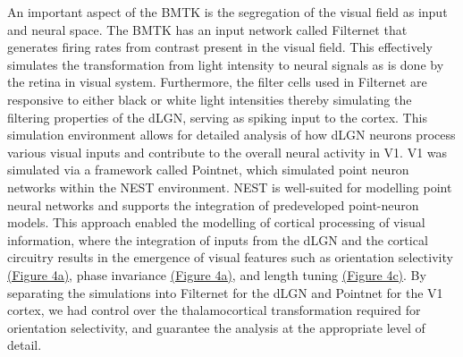 \documentclass[12pt]{article}
\begin{document}
An important aspect of the BMTK is the segregation of the visual field as input and neural space. The BMTK has an input network called Filternet that generates firing rates from contrast present in the visual field. This effectively simulates the transformation from light intensity to neural signals as is done by the retina in visual system. Furthermore, the filter cells used in Filternet are responsive to either black or white light intensities thereby simulating the filtering properties of the dLGN, serving as spiking input to the cortex. This simulation environment allows for detailed analysis of how dLGN neurons process various visual inputs and contribute to the overall neural activity in V1. V1 was simulated via a framework called Pointnet, which simulated point neuron networks within the NEST environment. NEST is well-suited for modelling point neural networks and supports the integration of predeveloped point-neuron models. This approach enabled the modelling of cortical processing of visual information, where the integration of inputs from the dLGN and the cortical circuitry results in the emergence of visual features such as orientation selectivity \hyperref[fig:LIF_Overview]{(Figure 4a)}, phase invariance \hyperref[fig:LIF_Overview]{(Figure 4a)}, and length tuning \hyperref[fig:LIF_Overview]{(Figure 4c)}. By separating the simulations into Filternet for the dLGN and Pointnet for the V1 cortex, we had control over the thalamocortical transformation required for orientation selectivity, and guarantee the analysis at the appropriate level of detail.
\bigbreak
\end{document}
